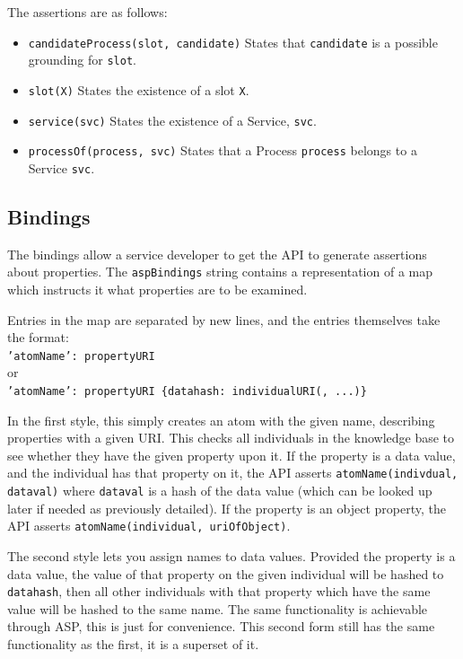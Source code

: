 \documentclass{llncs}
\begin{document}
 The assertions are as follows:
 \begin{itemize}
 	\item \texttt{candidateProcess(slot, candidate)} States that \texttt{candidate} is a possible grounding for \texttt{slot}.
 	\item \texttt{slot(X)} States the existence of a slot \texttt{X}.
 	\item \texttt{service(svc)} States the existence of a Service, \texttt{svc}.
 	\item \texttt{processOf(process, svc)} States that a Process \texttt{process} belongs to a Service \texttt{svc}.
 \end{itemize}

\subsection{Bindings}
 The bindings allow a service developer to get the API to generate assertions 
 about properties. The \texttt{aspBindings} string contains a representation 
 of a map which instructs it what properties are to be examined.

 Entries in the map are separated by new lines, and the entries themselves take 
 the format:\\
 \texttt{'atomName': propertyURI}\\
 or\\
 \texttt{'atomName': propertyURI \{datahash: individualURI(, ...)\}}

 In the first style, this simply creates an atom with the given name, describing 
 properties with a given URI. This checks all individuals in the knowledge base 
 to see whether they have the given property upon it. If the property is a 
 data value, and the individual has that property on it, the API asserts 
 \texttt{atomName(indivdual, dataval)} where \texttt{dataval} is a hash of the 
 data value (which can be looked up later if needed as previously detailed). If 
 the property is an object property, the API asserts 
 \texttt{atomName(individual, uriOfObject)}.

 The second style lets you assign names to data values. Provided the property 
 is a data value, the value of that property on the given individual will be 
 hashed to \texttt{datahash}, then all other individuals with that property 
 which have the same value will be hashed to the same name. The same functionality 
 is achievable through ASP, this is just for convenience. This second form still 
 has the same functionality as the first, it is a superset of it.
\end{document}
